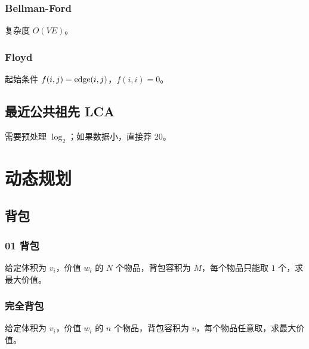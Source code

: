 \documentclass{probook}
\begin{document}
\begin{multicols}{2}
\subsection{Bellman-Ford}

复杂度 $O(VE)$。



\subsection{Floyd}

起始条件 $f(i,j)={\rm edge}(i,j)$，$f(i,i)=0$。



\section{最近公共祖先 LCA}

需要预处理 $\log_2$；如果数据小，直接莽 $20$。









\chapter{动态规划}

\section{背包}

\subsection{01 背包}

给定体积为 $v_i$，价值 $w_i$ 的 $N$ 个物品，背包容积为 $M$，每个物品只能取 $1$ 个，求最大价值。



\subsection{完全背包}

给定体积为 $v_i$，价值 $w_i$ 的 $n$ 个物品，背包容积为 $v$，每个物品任意取，求最大价值。


\end{multicols}
\end{document}
